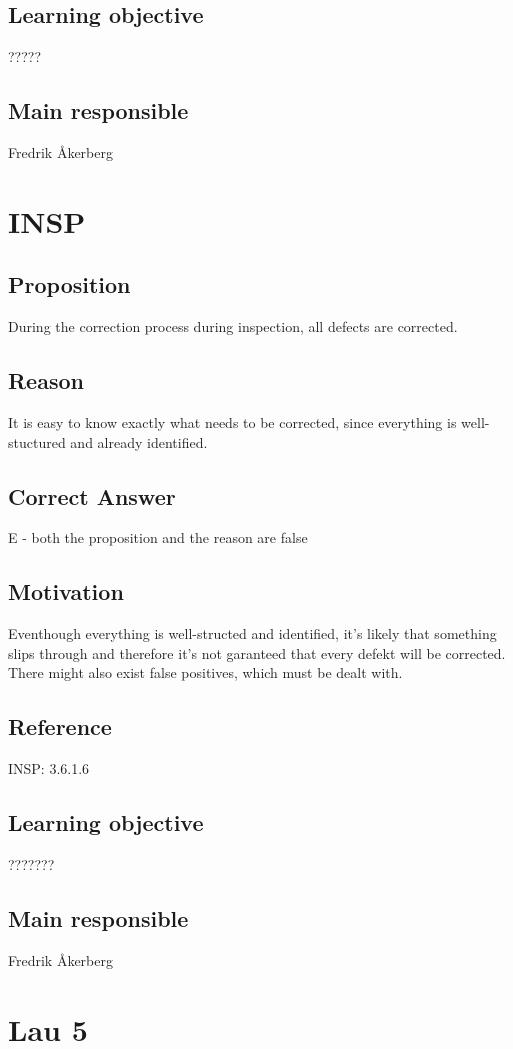 \documentclass[a4paper]{article}
\begin{document}
\subsection*{Learning objective}
?????
\subsection*{Main responsible}
 Fredrik Åkerberg


\section{INSP}
\subsection*{Proposition}
During the correction process during inspection, all defects are corrected.
\subsection*{Reason}
 It is easy to know exactly what needs to be corrected, since everything is well-stuctured and already identified.
\subsection*{Correct Answer}
E - both the proposition and the reason are false
\subsection*{Motivation}
Eventhough everything is well-structed and identified, it's likely that something slips through and therefore it's not garanteed that every defekt will be corrected.
There might also exist false positives, which must be dealt with.
\subsection*{Reference}
INSP: 3.6.1.6
\subsection*{Learning objective}
???????
\subsection*{Main responsible}
Fredrik Åkerberg

\section{Lau 5}
\end{document}

